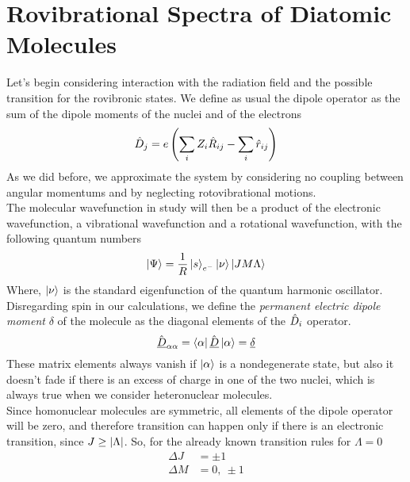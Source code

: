 \documentclass[../qm.tex]{subfiles}
\begin{document}
	\section{Rovibrational Spectra of Diatomic Molecules}
	Let's begin considering interaction with the radiation field and the possible transition for the rovibronic states. We define as usual the dipole operator as the sum of the dipole moments of the nuclei and of the electrons
	\begin{equation}
		\hat{D}_j=e\left( \sum_iZ_i\hat{R}_{ij}-\sum_i\hat{r}_{ij} \right)
		\label{eq:dipolemomentmolecule}
	\end{equation}
	As we did before, we approximate the system by considering no coupling between angular momentums and by neglecting rotovibrational motions.\\
	The molecular wavefunction in study will then be a product of the electronic wavefunction, a vibrational wavefunction and a rotational wavefunction, with the following quantum numbers
	\begin{equation}
		\ket{\Psi}=\frac{1}{R}\ket{s}_{e^-}\ket{\nu}\ket{JM\Lambda}
		\label{eq:molecularwavefunctionvibrations}
	\end{equation}
	Where, $\ket{\nu}$ is the standard eigenfunction of the quantum harmonic oscillator.\\
	Disregarding spin in our calculations, we define the \textit{permanent electric dipole moment} $\delta$ of the molecule as the diagonal elements of the $\hat{D}_i$ operator.\\
	\begin{equation*}
		\hat{\underline{D}}_{\alpha\alpha}=\bra{\alpha}\hat{\underline{D}}\ket{\alpha}=\underline{\delta}
	\end{equation*}
	These matrix elements always vanish if $\ket{\alpha}$ is a nondegenerate state, but also it doesn't fade if there is an excess of charge in one of the two nuclei, which is always true when we consider heteronuclear molecules.\\
	Since homonuclear molecules are symmetric, all elements of the dipole operator will be zero, and therefore transition can happen only if there is an electronic transition, since $J\ge\abs{\Lambda}$. So, for the already known transition rules for $\Lambda=0$
	\begin{equation*}
		\begin{aligned}
			\Delta J&=\pm1\\
			\Delta M&= 0,\ \pm1
		\end{aligned}
	\end{equation*}
\end{document}
